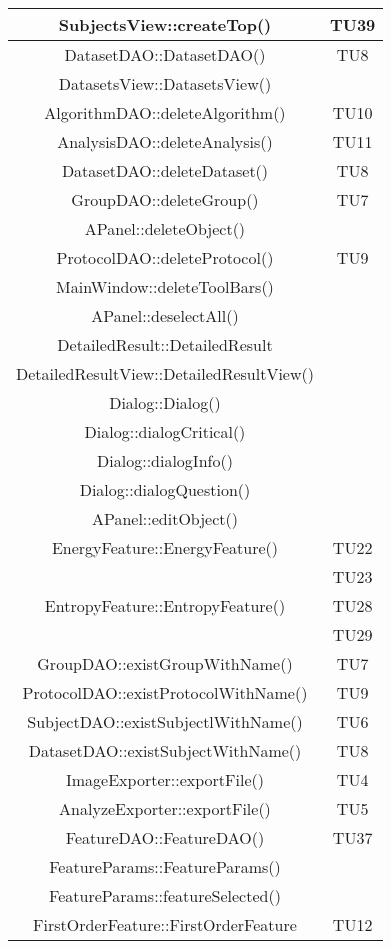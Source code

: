 \begin{center}
\begin{longtable}{|c|c|}
\hline 
SubjectsView::createTop() & TU39 \\
\hline 
DatasetDAO::DatasetDAO() & TU8 \\
\hline 
DatasetsView::DatasetsView() &  \\
\hline 
AlgorithmDAO::deleteAlgorithm() & TU10 \\
\hline 
AnalysisDAO::deleteAnalysis() & TU11 \\
\hline 
DatasetDAO::deleteDataset() & TU8 \\
\hline 
GroupDAO::deleteGroup() & TU7 \\
\hline 
APanel::deleteObject() &  \\
\hline 
ProtocolDAO::deleteProtocol() & TU9 \\
\hline 
MainWindow::deleteToolBars() &  \\
\hline 
APanel::deselectAll() &  \\
\hline 
DetailedResult::DetailedResult &  \\
\hline 
DetailedResultView::DetailedResultView() &  \\
\hline 
Dialog::Dialog() &  \\
\hline 
Dialog::dialogCritical() &  \\
\hline 
Dialog::dialogInfo() &  \\
\hline 
Dialog::dialogQuestion() &  \\
\hline 
APanel::editObject() &  \\
\hline 
EnergyFeature::EnergyFeature() & TU22 \\
 & TU23 \\
\hline 
EntropyFeature::EntropyFeature() & TU28 \\
 & TU29 \\
\hline 
GroupDAO::existGroupWithName() & TU7 \\
\hline 
ProtocolDAO::existProtocolWithName() & TU9 \\
\hline 
SubjectDAO::existSubjectlWithName() & TU6 \\
\hline 
DatasetDAO::existSubjectWithName() & TU8 \\
\hline 
ImageExporter::exportFile() & TU4 \\
\hline 
AnalyzeExporter::exportFile() & TU5 \\
\hline 
FeatureDAO::FeatureDAO() & TU37 \\
\hline 
FeatureParams::FeatureParams() &  \\
\hline 
FeatureParams::featureSelected() &  \\
\hline 
FirstOrderFeature::FirstOrderFeature & TU12 \\

\end{longtable}
\end{center}
